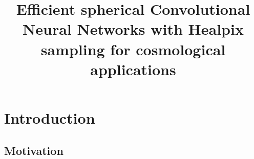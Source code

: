 \documentclass[preprint,12pt,authoryear]{elsarticle}
\newcommand{\assign}[1]{{\color[rgb]{.8,.5,.8}{Assigned: #1 }}}
\begin{document}
\begin{frontmatter}



\title{Efficient spherical Convolutional Neural Networks with Healpix sampling for cosmological applications}


\author{}

\address{}

\begin{abstract}

\end{abstract}

\begin{keyword}



\end{keyword}

\end{frontmatter}


\section{Introduction}
\label{sec:intro}




\subsection{Motivation}
\assign{Tomek}
\end{document}
